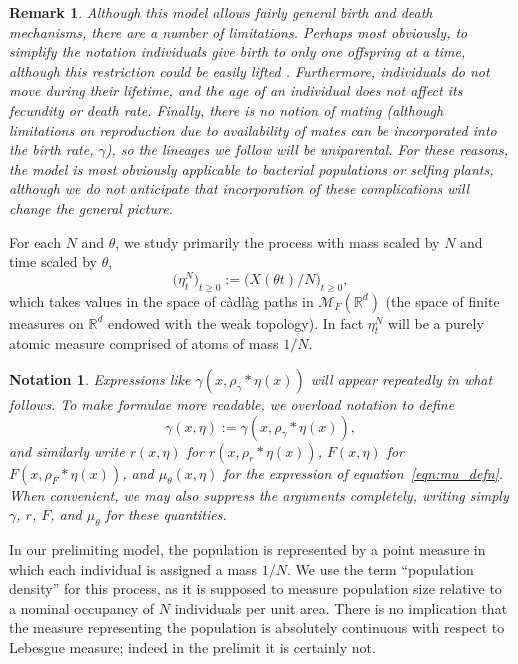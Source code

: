 \documentclass[12pt]{article}
\newtheorem{remark}[theorem]{Remark}
\newtheorem{notation}[theorem]{Notation}
\newcommand{\IR}{\mathbb R}
\newcommand{\kernel}{\rho}  %
\newcommand{\smooth}[1]{\kernel_{#1} \! * \!}  %
\newcommand{\measures}{\mathcal{M}_F(\IR^d)} %
\numberwithin{equation}{section}
\begin{document}
\begin{remark}
Although this model allows fairly general birth and death mechanisms,
there are a number of limitations.
Perhaps most obviously, to simplify the notation
individuals give birth to only one offspring at a time,
although this restriction could be easily lifted
\citep[as in Section 3.4 of][]{etheridge/kurtz:2019}.
Furthermore, individuals do not move during their lifetime,
and the age of an individual does not affect its fecundity or death rate.
Finally, there is no notion of mating
(although limitations on reproduction due to availability of mates can be incorporated into the birth rate, $\gamma$),
so the lineages we follow will be uniparental.
For these reasons, the model is most obviously applicable to bacterial populations or selfing plants,
although we do not anticipate that incorporation of these complications
will change the general picture.
\end{remark}


For each $N$ and $\theta$, we study primarily the process
with mass scaled by $N$ and time scaled by $\theta$,
$$ \big(\eta^N_t\big)_{t\geq 0} := \big(X(\theta t)/N\big)_{t\geq 0} , $$ 
which takes values in the space of c\`adl\`ag paths in
$\measures$ (the space of finite measures on $\IR^d$
endowed with the weak topology). In fact $\eta_t^N$ will be a purely atomic
measure comprised of atoms of mass $1/N$.

\begin{notation}
Expressions like $\gamma(x, \smooth{\gamma} \eta(x))$ will appear repeatedly in what follows.
To make formulae more readable, we overload notation to define
$$
    \gamma(x, \eta) := \gamma(x, \smooth{\gamma} \eta(x)) ,
$$
and similarly write $r(x, \eta)$ for $r(x, \smooth{r} \eta(x))$,
$F(x, \eta)$ for $F(x, \smooth{F} \eta(x))$,
and $\mu_\theta(x, \eta)$ for the expression of equation~\eqref{eqn:mu_defn}.
When convenient, we may also suppress the arguments completely,
writing simply $\gamma$, $r$, $F$, and $\mu_\theta$ for these quantities.
\end{notation}

\begin{terminology*}
In our prelimiting model,
the population is represented by a point measure in which each
individual is assigned a mass $1/N$. We use the term ``population density'' for
this process, as it is supposed to measure population size relative to a 
nominal occupancy of $N$ individuals per unit area. There is no implication 
that the measure representing the population is absolutely continuous with
respect to Lebesgue measure; indeed in the prelimit it is certainly not.
\end{terminology*} 
\end{document}
